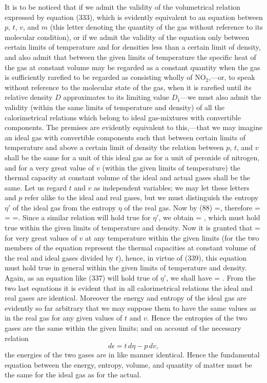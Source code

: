 \documentclass[12pt]{memoir}
\begin{document}
It is to be noticed that if we admit the validity of the volumetrical relation expressed by equation (333), which is evidently equivalent to an equation between $p$, $t$, $v$, and $m$ (this letter denoting the quantity of the gas without reference to its molecular condition), or if we admit the validity of the equation only between certain limits of temperature and for densities less than a certain limit of density, and also admit that between the given limits of temperature the specific heat of the gas at constant volume may be regarded as a constant quantity when the gas is sufficiently rarefied to be regarded as consisting wholly of NO$_2$,---or, to speak without reference to the molecular state of the gas, when it is rarefied until its relative density $D$ approximates to its limiting value $D_1$---we must also admit the validity (within the same limits of temperature and density) of all the calorimetrical relations which belong to ideal gas-mixtures with convertible components. The premises are evidently equivalent to this,---that we may imagine an ideal gas with convertible components such that between certain limits of temperature and above a certain limit of density the relation between $p$, $t$, and $v$ shall be the same for a unit of this ideal gas as for a unit of peroxide of nitrogen, and for a very great value of $v$ (within the given limits of temperature) the thermal capacity at constant volume of the ideal and actual gases shall be the same. Let us regard $t$ and $v$ as independent variables; we may let these letters and $p$ refer alike to the ideal and real gases, but we must distinguish the entropy $\eta'$ of the ideal gas from the entropy $\eta$ of the real gas. Now by (88)
\eqs {}=,          \label{337}\eqe
therefore
\eqs  {} =  =   =.   \label{338}\eqe
Since a similar relation will hold true for $\eta'$, we obtain
\eqs {} = , \label{339}\eqe
which must hold true within the given limits of temperature and density. Now it is granted that
\eqs {} = \label{340}\eqe
for very great values of $v$ at any temperature within the given limits (for the two members of the equation represent the thermal capacities at constant volume of the real and ideal gases divided by $t$), hence, in virtue of (339), this equation must hold true in general within the given limits of temperature and density. Again, as an equation like (337) will hold true of $\eta'$, we shall have
\eqs {} = . \label{341}\eqe
From the two last equations it is evident that in all calorimetrical relations the ideal and real gases are identical. Moreover the energy and entropy of the ideal gas are evidently so far arbitrary that we may suppose them to have the same values as in the real gas for any given values of $t$ and $v$. Hence the entropies of the two gases are the same within the given limits; and on account of the necessary relation
$$d\epsilon = t \,d\eta-p \, dv,$$
the energies of the two gases are in like manner identical. Hence the fundamental equation between the energy, entropy, volume, and quantity of matter must be the same for the ideal gas as for the actual.
\end{document}
